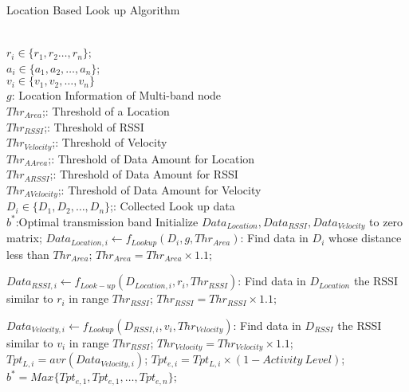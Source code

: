 	  \begin{algorithm}
	  \caption{Location Based Look up Algorithm}
	  \label{algorithms: Location}
	  \begin{algorithmic}[1]
	  \REQUIRE  ~~\\
		  $r_i \in \{r_1,r_2 \dots,r_n\}$;\\
		  $a_i \in \{a_1,a_2, \dots, a_n\}$;\\
		  $v_i \in \{v_1,v_2,\dots,v_n\}$\\
		  $g$: Location Information of Multi-band node\\
		  $Thr_{Area}$;: Threshold of a Location\\
		  $Thr_{RSSI}$;: Threshold of RSSI\\
		  $Thr_{Velocity}$;: Threshold of Velocity\\
		  $Thr_{A Area}$;: Threshold of Data Amount for Location\\
		  $Thr_{A RSSI}$;: Threshold of Data Amount for RSSI\\
		  $Thr_{A Velocity}$;: Threshold of Data Amount for Velocity\\
		  $D_i \in \{D_1,D_2,\dots,D_n\}$;: Collected Look up data
\ENSURE ~~\\    
		  $b^*$:Optimal transmission band
\STATE Initialize \emph{$Data_{Location},Data_{RSSI},Data_{Velocity}$} to zero matrix;
\STATE $Data_{Location,i} \leftarrow f_{Lookup}(D_i,g,Thr_{Area})$: Find data in $D_i$ whose distance less than $Thr_{Area}$;
\STATE $Thr_{Area}=Thr_{Area} \times 1.1$;
\ENDWHILE

\STATE $Data_{RSSI,i} \leftarrow f_{Look-up}(D_{Location,i},r_i,Thr_{RSSI})$: Find data in $D_{Location}$ the RSSI similar to $r_i$ in range $Thr_{RSSI}$;
\STATE $Thr_{RSSI}=Thr_{RSSI} \times 1.1$;
\ENDWHILE

\STATE $Data_{Velocity,i} \leftarrow f_{Lookup}(D_{RSSI,i},v_i,Thr_{Velocity})$: Find data in $D_{RSSI}$ the RSSI similar to $v_i$ in range $Thr_{RSSI}$;
\STATE $Thr_{Velocity}=Thr_{Velocity} \times 1.1$;
\ENDWHILE \\

\STATE $Tpt_{L,i}=avr(Data_{Velocity,i})$;
\STATE  $Tpt_{e,i}=Tpt_{L,i}\times(1-Activity \ Level)$;
\ENDFOR \\  
\STATE $b^*=Max\{Tpt_{e,1},Tpt_{e,1},\dots,Tpt_{e,n}\}$;\\
\end{algorithmic}
\end{algorithm}



